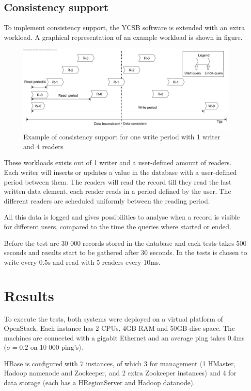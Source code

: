 \documentclass[final,5p,times]{elsarticle}
\begin{document}
\subsection{Consistency support}
To implement consistency support, the YCSB software is extended with an extra workload. A graphical representation of an example workload is shown in figure. 
\begin{figure}[h]
\centering
\includegraphics[width=\linewidth]{../img/Consistency-test-period}
\caption{Example of consistency support for one write period with 1 writer and 4 readers}
\end{figure}
These workloads exists out of 1 writer and a user-defined amount of readers.  Each writer will inserts or updates a value in the database with a user-defined period between them. The readers will read the record till they read the last written data element, each reader reads in a period defined by the user. The different readers are scheduled uniformly between the reading period. 

All this data is logged and gives possibilities to analyse when a record is visible for different users, compared to the time the queries where started or ended. 

Before the test are 30 000 records stored in the database and each tests takes 500 seconds and results start to be gathered after 30 seconds. In the tests is chosen to write every 0.5s and read with 5 readers every 10ms. 
 

\section{Results}\label{sec:result}
To execute the tests, both systems were deployed on a virtual platform of OpenStack. Each instance has 2 CPUs, 4GB RAM and 50GB disc space. The machines are connected with a gigabit Ethernet and an average ping takes 0.4ms ($\sigma = 0.2$ on 10 000 ping's).

HBase is configured with 7 instances, of which 3 for management (1 HMaster, Hadoop namenode and Zookeeper, and 2 extra Zookeeper instances) and 4 for data storage (each has a HRegionServer and Hadoop datanode). 
\end{document}
